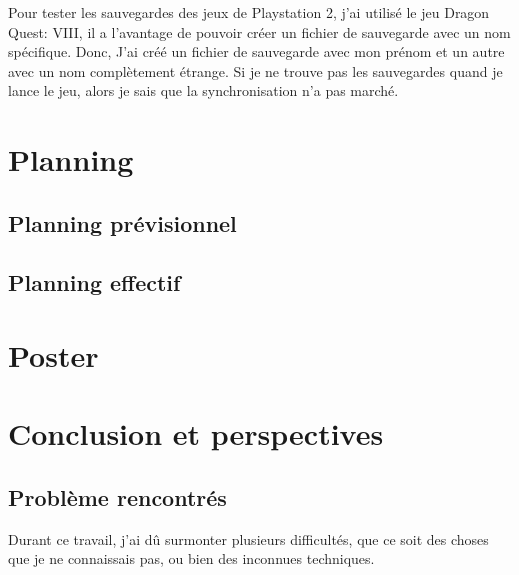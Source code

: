 \documentclass[a4paper,12pt,french]{sphinxmanual}
\begin{document}
\sphinxAtStartPar
Pour tester les sauvegardes des jeux de Playstation 2, j’ai utilisé le jeu Dragon Quest: VIII, il a l’avantage de pouvoir créer un fichier de sauvegarde avec un nom spécifique. Donc, J’ai créé un fichier de sauvegarde avec mon prénom et un autre avec un nom complètement étrange. Si je ne trouve pas les sauvegardes quand je lance le jeu, alors je sais que la synchronisation n’a pas marché.


\chapter{Planning}
\label{\detokenize{planning:planning}}\label{\detokenize{planning::doc}}

\section{Planning prévisionnel}
\label{\detokenize{planning:planning-previsionnel}}
\sphinxAtStartPar
{}

\sphinxAtStartPar
{}


\section{Planning effectif}
\label{\detokenize{planning:planning-effectif}}
\sphinxAtStartPar
{}

\sphinxAtStartPar
{}


\chapter{Poster}
\label{\detokenize{poster:poster}}\label{\detokenize{poster::doc}}
\sphinxAtStartPar
{}


\chapter{Conclusion et perspectives}
\label{\detokenize{conclusion:conclusion-et-perspectives}}\label{\detokenize{conclusion::doc}}

\section{Problème rencontrés}
\label{\detokenize{conclusion:probleme-rencontres}}
\sphinxAtStartPar
Durant ce travail, j’ai dû surmonter plusieurs difficultés, que ce soit des choses que je ne connaissais pas, ou bien des inconnues techniques.
\end{document}

